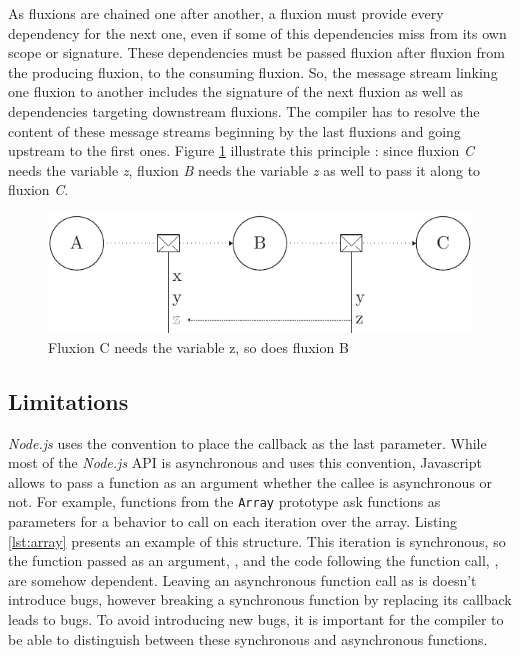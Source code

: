 As fluxions are chained one after another, a fluxion must provide every dependency for the next one, even if some of this dependencies miss from its own scope or signature.
These dependencies must be passed fluxion after fluxion from the producing fluxion, to the consuming fluxion.
So, the message stream linking one fluxion to another includes the signature of the next fluxion as well as dependencies targeting downstream fluxions.
The compiler has to resolve the content of these message streams beginning by the last fluxions and going upstream to the first ones.
Figure \ref{fig:streamline} illustrate this principle : since fluxion \textit{C} needs the variable \textit{z}, fluxion \textit{B} needs the variable \textit{z} as well to pass it along to fluxion \textit{C}.

\begin{figure}[h!]
  \includegraphics[width=\linewidth]{streamline.pdf}
  \caption{Fluxion C needs the variable z, so does fluxion B}
  \label{fig:streamline}
\end{figure}

\subsection{Limitations} \label{ss:Limitations}

\textit{Node.js} uses the convention to place the callback as the last parameter.
While most of the \textit{Node.js} API is asynchronous and uses this convention, Javascript allows to pass a function as an argument whether the callee is asynchronous or not.
For example, functions from the \texttt{Array} prototype ask functions as parameters for a behavior to call on each iteration over the array.
Listing \ref{lst:array} presents an example of this structure.
This iteration is synchronous, so the function passed as an argument, , and the code following the function call, , are somehow dependent.
Leaving an asynchronous function call as is doesn't introduce bugs, however breaking a synchronous function by replacing its callback leads to bugs.
To avoid introducing new bugs, it is important for the compiler to be able to distinguish between these synchronous and asynchronous functions.

